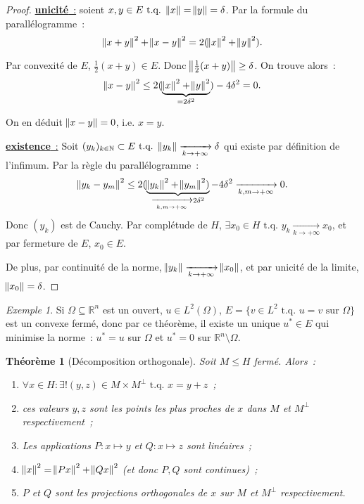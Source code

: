 \documentclass{report}
\newcommand{\R}{{\mathbb R}}
\newcommand{\N}{{\mathbb N}}
\newcommand{\tq}{\text{ t.q. }}
\newcommand{\pinfty}{{+\infty}}
\newcommand{\unic}{{\underline {\textbf{unicité}~:}} }
\newcommand{\exis}{{\underline {\textbf{existence}~:}} }
\newtheorem{thm}{Théorème}[chapter]
\theoremstyle{definition}
\theoremstyle{remark}
\newtheorem{ex}{Exemple}[chapter]
\begin{document}
\begin{proof} \unic soient $x, y \in E \tq \norm x = \norm y = \delta$. Par la formule du parallélogramme~:
\[\norm {x+y}^2 + \norm {x-y}^2 = 2(\norm x^2+\norm y^2).\]

Par convexité de $E$, $\frac 12(x+y) \in E$. Donc $\norm {\frac 12(x+y)} \geq \delta$. On trouve alors~:
\[\norm {x-y}^2 \leq 2(\underbrace {\norm x^2 + \norm y^2}_{=2\delta^2}) - 4\delta^2 = 0.\]

On en déduit $\norm {x-y} = 0$, i.e. $x=y$.

\exis Soit $(y_k)_{k \in \N} \subset E \tq \norm {y_k} \xrightarrow[k \to \pinfty]{} \delta$ qui existe par définition de l'infimum. Par la règle du parallélogramme~:
\[\norm {y_k - y_m}^2 \leq 2(\underbrace {\norm {y_k}^2+\norm {y_m}^2)}_{\xrightarrow[k, m \to \pinfty]{} 2\delta^2} - 4\delta^2 \xrightarrow[k, m \to \pinfty]{} 0.\]
Donc $(y_k)$ est de Cauchy. Par complétude de $H$, $\exists x_0 \in H \tq y_k \xrightarrow[k \to \pinfty]{} x_0$, et par fermeture de $E$, $x_0 \in E$.

De plus, par continuité de la norme, $\norm {y_k} \xrightarrow[k \to \pinfty]{} \norm {x_0}$, et par unicité de la limite, $\norm {x_0} = \delta$.
\end{proof}

\begin{ex} Si $\Omega \subseteq \R^n$ est un ouvert, $u \in L^2(\Omega)$, $E = \{v \in L^2 \tq u=v \text{ sur } \Omega\}$ est un convexe fermé, donc par ce théorème,
il existe un unique $u^* \in E$ qui minimise la norme~: $u^* = u$ sur $\Omega$ et $u^*=0$ sur $\R^n \setminus \Omega$.
\end{ex}

\begin{thm}[Décomposition orthogonale] Soit $M \leq H$ fermé. Alors~:
\begin{enumerate}
	\item $\forall x \in H : \exists! (y, z) \in M \times M^\perp \tq x=y+z$~;
	\item ces valeurs $y, z$ sont les points les plus proches de $x$ dans $M$ et $M^\perp$ respectivement~;
	\item Les applications $P : x \mapsto y$ et $Q : x \mapsto z$ sont linéaires~;
	\item $\norm x^2 = \norm {Px}^2 + \norm {Qx}^2$ (et donc $P,Q$ sont continues)~;
	\item $P$ et $Q$ sont les projections orthogonales de $x$ sur $M$ et $M^\perp$ respectivement.
\end{enumerate}
\end{thm}
\end{document}
